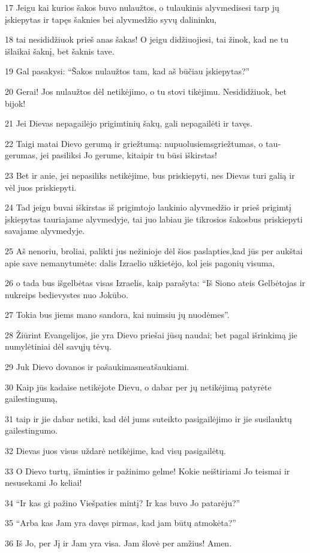 \par 17 Jeigu kai kurios šakos buvo nulaužtos, o tu­laukinis alyvmedis­esi tarp jų įskiepytas ir tapęs šaknies bei alyvmedžio syvų dalininku, 
\par 18 tai nesididžiuok prieš anas šakas! O jeigu didžiuojiesi, tai žinok, kad ne tu išlaikai šaknį, bet šaknis tave. 
\par 19 Gal pasakysi: “Šakos nulaužtos tam, kad aš būčiau įskiepytas?” 
\par 20 Gerai! Jos nulaužtos dėl netikėjimo, o tu stovi tikėjimu. Nesididžiuok, bet bijok! 
\par 21 Jei Dievas nepagailėjo prigimtinių šakų, gali nepagailėti ir tavęs. 
\par 22 Taigi matai Dievo gerumą ir griežtumą: nupuolusiems­griežtumas, o tau­gerumas, jei pasiliksi Jo gerume, kitaip­ir tu būsi iškirstas! 
\par 23 Bet ir anie, jei nepasiliks netikėjime, bus priskiepyti, nes Dievas turi galią ir vėl juos priskiepyti. 
\par 24 Tad jeigu buvai iškirstas iš prigimtojo laukinio alyvmedžio ir prieš prigimtį įskiepytas tauriajame alyvmedyje, tai juo labiau jie­ tikrosios šakos­bus priskiepyti savajame alyvmedyje. 
\par 25 Aš nenoriu, broliai, palikti jus nežinioje dėl šios paslapties,­kad jūs per aukštai apie save nemanytumėte: dalis Izraelio užkietėjo, kol įeis pagonių visuma, 
\par 26 o tada bus išgelbėtas visas Izraelis, kaip parašyta: “Iš Siono ateis Gelbėtojas ir nukreips bedievystes nuo Jokūbo. 
\par 27 Tokia bus jiems mano sandora, kai nuimsiu jų nuodėmes”. 
\par 28 Žiūrint Evangelijos, jie yra Dievo priešai jūsų naudai; bet pagal išrinkimą jie numylėtiniai dėl savųjų tėvų. 
\par 29 Juk Dievo dovanos ir pašaukimas­neatšaukiami. 
\par 30 Kaip jūs kadaise netikėjote Dievu, o dabar per jų netikėjimą patyrėte gailestingumą, 
\par 31 taip ir jie dabar netiki, kad dėl jums suteikto pasigailėjimo ir jie susilauktų gailestingumo. 
\par 32 Dievas juos visus uždarė netikėjime, kad visų pasigailėtų. 
\par 33 O Dievo turtų, išminties ir pažinimo gelme! Kokie neištiriami Jo teismai ir nesusekami Jo keliai! 
\par 34 “Ir kas gi pažino Viešpaties mintį? Ir kas buvo Jo patarėju?” 
\par 35 “Arba kas Jam yra davęs pirmas, kad jam būtų atmokėta?” 
\par 36 Iš Jo, per Jį ir Jam yra visa. Jam šlovė per amžius! Amen.



